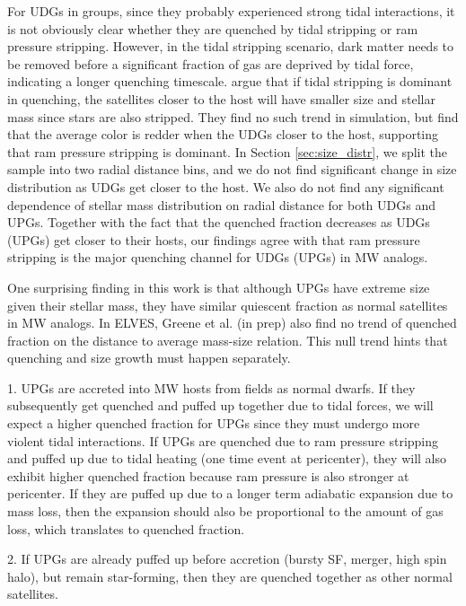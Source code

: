 \documentclass[twocolumn,astrosymb,twocolappendix]{aastex631}
\begin{document}
\begin{CJK*}{UTF8}{gbsn}
For UDGs in groups, since they probably experienced strong tidal interactions, it is not obviously clear whether they are quenched by tidal stripping or ram pressure stripping. However, in the tidal stripping scenario, dark matter needs to be removed before a significant fraction of gas are deprived by tidal force, indicating a longer quenching timescale. \citet{Jiang2019} argue that if tidal stripping is dominant in quenching, the satellites closer to the host will have smaller size and stellar mass since stars are also stripped. They find no such trend in simulation, but find that the average color is redder when the UDGs closer to the host, supporting that ram pressure stripping is dominant. In Section \ref{sec:size_distr}, we split the sample into two radial distance bins, and we do not find significant change in size distribution as UDGs get closer to the host. We also do not find any significant dependence of stellar mass distribution on radial distance for both UDGs and UPGs. Together with the fact that the quenched fraction decreases as UDGs (UPGs) get closer to their hosts, our findings agree with \citet{Jiang2019} that ram pressure stripping is the major quenching channel for UDGs (UPGs) in MW analogs. 


One surprising finding in this work is that although UPGs have extreme size given their stellar mass, they have similar quiescent fraction as normal satellites in MW analogs. In ELVES, Greene et al. (in prep) also find no trend of quenched fraction on the distance to average mass-size relation. This null trend hints that quenching and size growth must happen separately. 

1. UPGs are accreted into MW hosts from fields as normal dwarfs. If they subsequently get quenched and puffed up together due to tidal forces, we will expect a higher quenched fraction for UPGs since they must undergo more violent tidal interactions. If UPGs are quenched due to ram pressure stripping and puffed up due to tidal heating (one time event at pericenter), they will also exhibit higher quenched fraction because ram pressure is also stronger at pericenter. If they are puffed up due to a longer term adiabatic expansion \citep{Tremmel2020} due to mass loss, then the expansion should also be proportional to the amount of gas loss, which translates to quenched fraction.

2. If UPGs are already puffed up before accretion (bursty SF, merger, high spin halo), but remain star-forming, then they are quenched together as other normal satellites. 


\end{CJK*}
\end{document}
